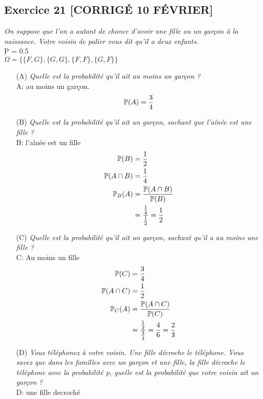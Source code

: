 \subsection*{Exercice 21 [CORRIGÉ 10 FÉVRIER]}
\textit{On suppose que l’on a autant de chance d’avoir une fille ou un garçon à la naissance. Votre voisin de palier vous dit qu’il a deux enfants.}\\
P = 0.5\\
$\Omega = \{\{F, G\}, \{G, G\}, \{F, F\}, \{G, F\}\}$
\begin{itemize}
    \item[(A)]  \textit{Quelle est la probabilité qu’il ait au moins un garçon ?}\\
    A: au moins un garçon.
    \begin{equation*}
        \mathbb{P}(A) = \frac{3}{4}
    \end{equation*}
    \item[(B)]  \textit{Quelle est la probabilité qu’il ait un garçon, sachant que l’aînée est une fille ?}\\
    B: l'aînée est un fille
    \begin{align*}
        \mathbb{P}(B) &= \frac{1}{2} \\
        \mathbb{P}(A \cap B) &= \frac{1}{4}\\
        \mathbb{P}_B(A) &= \frac{\mathbb{P}(A \cap B)}{\mathbb{P}(B)} \\
        &= \frac{\frac{1}{4}}{\frac{1}{2}} =\frac{1}{2}
    \end{align*}
    \item[(C)]  \textit{Quelle est la probabilité qu’il ait un garçon, sachant qu’il a au moins une fille ?}\\
    C: Au moins un fille
    \begin{align*}
        \mathbb{P}(C) &= \frac{3}{4} \\
        \mathbb{P}(A \cap C) &= \frac{1}{2}\\
        \mathbb{P}_C(A) &= \frac{\mathbb{P}(A \cap C)}{\mathbb{P}(C)} \\
        &= \frac{\frac{1}{2}}{\frac{3}{4}} = \frac{4}{6} = \frac{2}{3}
    \end{align*}
    \item[(D)]  \textit{Vous téléphonez à votre voisin. Une fille décroche le téléphone. Vous savez que dans les familles avec un garçon et une fille, la fille décroche le téléphone avec la probabilité p, quelle est la probabilité que votre voisin ait un garçon ?}\\
        D: une fille decroché
    

\end{itemize}
